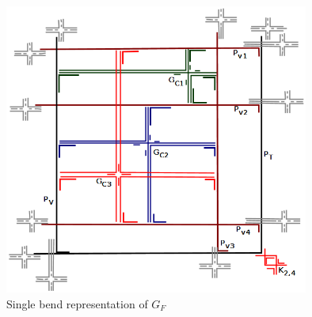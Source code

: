 \begin{figure}[htb]	
\center%
\includegraphics[width=10cm]{./img/formulaFGCompletaPies.png}
\caption{Single bend representation of $G_F$}
\label{fig:gadgetFormulaCompletaPies}
\end{figure}